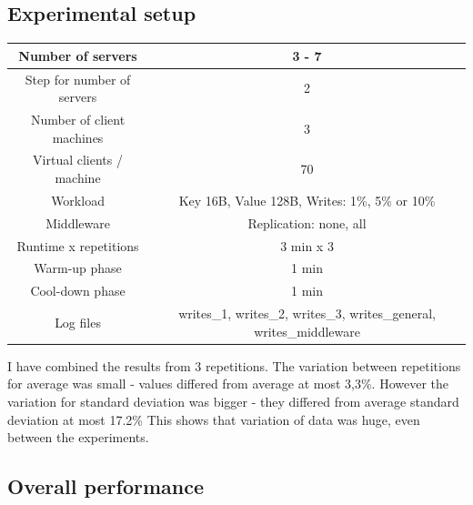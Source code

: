 \documentclass[11pt]{article}
\begin{document}
\subsection{Experimental setup}

\small{
\smallskip
\begin{tabular}{|c|c|}
\hline Number of servers & 3 - 7 \\ 
\hline Step for number of servers & 2 \\
\hline Number of client machines & 3 \\ 
\hline Virtual clients / machine &  70 \\ 
\hline Workload & Key 16B, Value 128B, Writes: 1\%, 5\% or 10\% \\
\hline Middleware & Replication: none, all \\ 
\hline Runtime x repetitions & 3 min x 3 \\
\hline Warm-up phase & 1 min \\
\hline Cool-down phase & 1 min \\
\hline Log files & writes\_1, writes\_2, writes\_3, writes\_general, writes\_middleware \\
\hline 
\end{tabular} }
\medskip

I have combined the results from 3 repetitions. The variation between repetitions for average was small - values differed from average at most 3,3\%. However the variation for standard deviation was bigger - they differed from average standard deviation at most 17.2\%  This shows that variation of data was huge, even between the experiments.

\subsection{Overall performance}
\end{document}
